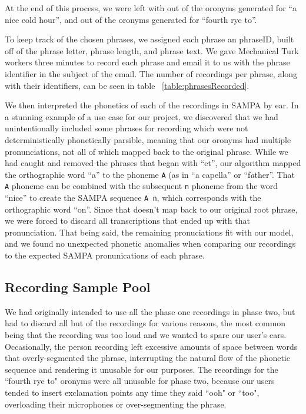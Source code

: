 At the end of this process, we were left with \phaseOneANiceColdHourOronymsRecordedUnique out of the \aNiceColdHourOronymCount oronyms generated for ``a nice cold hour'', and \phaseOneFourthRyeToOronymsRecordedUnique out of the \forthRyeToOronymCount oronyms generated for ``fourth rye to''. 


To keep track of the chosen phrases, we assigned each phrase an phraseID, built off of the phrase letter, phrase length, and phrase text. We gave Mechanical Turk workers three minutes to record each phrase and email it to us with the phrase identifier in the subject of the email. The number of recordings per phrase, along with their identifiers, can be seen in table ~\ref{table:phrasesRecorded}.

We then interpreted the phonetics of each of the recordings in SAMPA by ear.  In a stunning example of a use case for our project, we discovered that we had unintentionally included some phrases for recording which were not deterministically phonetically parsible, meaning that our oronyms had multiple pronunciations, not all of which mapped back to the original phrase.  While we had caught and removed the phrases that began with ``et'', our algorithm mapped the orthographic word ``a'' to the phoneme \texttt{A} (as in ``a capella'' or ``f\emph{a}ther''. That \texttt{A} phoneme can be combined with the subsequent \texttt{n} phoneme from the word ``nice'' to create the SAMPA sequence \texttt{A n}, which corresponds with the orthographic word ``on''.  Since that doesn't map back to our original root phrase, we were forced to discard all transcriptions that ended up with that pronunciation. That being said, the remaining pronuciations fit with our model, and we found no unexpected phonetic anomalies when comparing our recordings to the expected SAMPA pronunications of each phrase.



\subsection{Recording Sample Pool}
\label{subsection:recordingSamplePool}
We had originally intended to use all the phase one recordings in phase two, but had to discard all but \recordingsPhaseTwoUserStudy of the recordings for various reasons, the most common being that the recording was too loud and we wanted to spare our user's ears. Occasionally, the person recording left excessive amounts of space between words that overly-segmented the phrase, interrupting the natural flow of the phonetic sequence and rendering it unusable for our purposes.  The recordings for the ``fourth rye to" oronyms were all unusable for phase two, because our users tended to insert exclamation points any time they said ``ooh" or ``too", overloading their microphones or over-segmenting the phrase.

